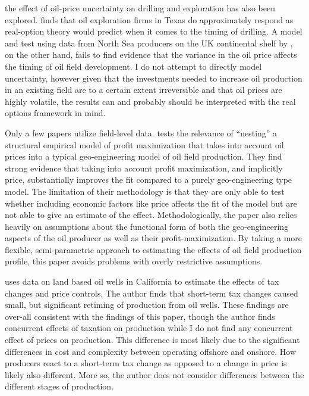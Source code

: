 \documentclass[11pt]{article}
\begin{document}
the effect of oil-price uncertainty on drilling and exploration has also been explored.  \citet{kellogg_effect_2014} finds that oil exploration firms in Texas do approximately respond as real-option theory would predict when it comes to the timing of drilling.  A model and test using data from North Sea producers on the UK continental shelf by \citet{hurn_geology_1994}, on the other hand, fails to find evidence that the variance in the oil price affects the timing of oil field development.  I do not attempt to directly model uncertainty, however given that the investments needed to increase oil production in an existing field are to a certain extent irreversible and that oil prices are highly volatile, the results can and probably should be interpreted with the real options framework in mind.  

Only a few papers utilize field-level data.  \citet{black_is_1998} tests the relevance of “nesting” a structural empirical model of profit maximization that takes into account oil prices into a typical geo-engineering model of oil field production.  They find strong evidence that taking into account profit maximization, and implicitly price, substantially improves the fit compared to a purely geo-engineering type model.   The limitation of their methodology is that they are only able to test whether including economic factors like price affects the fit of the model but are not able to give an estimate of the effect.  Methodologically, the paper also relies heavily on assumptions about the functional form of both the geo-engineering aspects of the oil producer as well as their profit-maximization.  By taking a more flexible, semi-parametric approach to estimating the effects of oil field production profile, this paper avoids problems with overly restrictive assumptions. 

\citet{rao_taxation_2010} uses data on land based oil wells in California to estimate the effects of tax changes and price controls.  The author finds that short-term tax changes caused small, but significant retiming of production from oil wells.  These findings are over-all consistent with the findings of this paper, though the author finds concurrent effects of taxation on production while I do not find any concurrent effect of prices on production.  This difference is most likely due to the significant differences in cost and complexity between operating offshore and onshore.  How producers react to a short-term tax change as opposed to a change in price is likely also different.  More so, the author does not consider differences between the different stages of production.   
\end{document}
